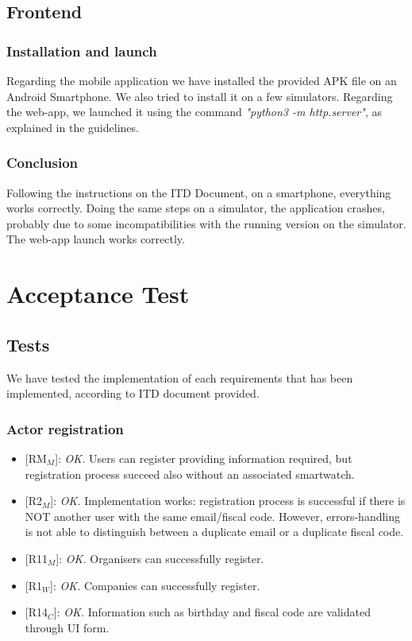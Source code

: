 \documentclass{article}
\begin{document}
\newpage	
\subsection{Frontend}
\subsubsection{Installation and launch}
Regarding the mobile application we have installed the provided APK file on an Android Smartphone. We also tried to install it on a few simulators.\newline
Regarding the web-app, we launched it using the command \textit{"python3 -m http.server"}, as explained in the guidelines.
\subsubsection{Conclusion}
Following the instructions on the ITD Document, on a smartphone, everything works correctly.
Doing the same steps on a simulator, the application crashes, probably due to some incompatibilities with the running version on the simulator.	\newline
The web-app launch works correctly.

\newpage
\section{Acceptance Test}
\subsection{Tests}
We have tested the implementation of each requirements that has been implemented, according to ITD document provided.

\subsubsection{Actor registration}
\begin{itemize}
	\item {[RM$_M$]}: \textit{OK.} Users can register providing information required, but registration process succeed also without an associated smartwatch.
	\item {[R2$_M$]}: \textit{OK.} Implementation works: registration process is successful if  there is NOT another user with the same email/fiscal code. However, errors-handling is not able to distinguish between a duplicate email or a duplicate fiscal code.
	\item {[R11$_M$]}: \textit{OK.} Organisers can successfully register.
	\item {[R1$_W$]}: \textit{OK.} Companies can successfully register.
	\item {[R14$_C$]}: \textit{OK.} Information such as birthday and fiscal code are validated through UI form.
\end{itemize}
\end{document}
